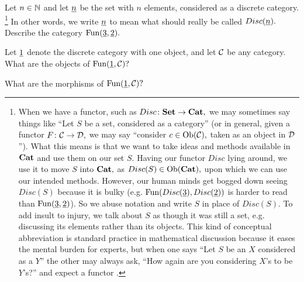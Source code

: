 \documentclass[CT4S-EN-RU]{subfiles}
\begin{document}
\begin{exerciseENG}
Let $n\in{\mathbb N}$ and let $\underline{n}$ be the set with $n$ elements, considered as a discrete category.
\footnote{When we have a functor, such as $Disc\colon{\mathbf{Set}}\rightarrow{\mathbf{Cat}},$ we may sometimes say things like “Let $S$ be a set, considered as a category” (or in general, given a functor $F\colon\mathcal{C}\rightarrow\mathcal{D},$ we may say “consider $c\in\textnormal{Ob}(\mathcal{C}),$ taken as an object in $\mathcal{D}$”). What this means is that we want to take ideas and methods available in ${\mathbf{Cat}}$ and use them on our set $S.$ Having our functor $Disc$ lying around, we use it to move $S$ into ${\mathbf{Cat}},$ as $Disc(S)\in\textnormal{Ob}({\mathbf{Cat}}),$ upon which we can use our intended methods. However, our human minds get bogged down seeing $Disc(S)$ because it is bulky (e.g. $\textnormal{Fun}(Disc(\underline{3}),Disc(\underline{2}))$ is harder to read than $\textnormal{Fun}(\underline{3},\underline{2})$). So we abuse notation and write $S$ in place of  $Disc(S).$ To add insult to injury, we talk about $S$ as though it was still a set, e.g. discussing its elements rather than its objects. This kind of conceptual abbreviation is standard practice in mathematical discussion because it eases the mental burden for experts, but when one says “Let $S$ be an $X$ considered as a $Y$” the other may always ask, “How again are you considering $X$'s to be $Y$'s?” and expect a functor .}
In other words, we write $\underline{n}$ to mean what should really be called $Disc(\underline{n}).$ Describe the category $\textnormal{Fun}(\underline{3},\underline{2}).$
\end{exerciseENG}

\begin{exerciseRUS}
\end{exerciseRUS}

\begin{exerciseENG}
Let $\underline{1}$ denote the discrete category with one object, and let $\mathcal{C}$ be any category.
\sexc What are the objects of $\textnormal{Fun}(\underline{1},\mathcal{C})?$
\item What are the morphisms of $\textnormal{Fun}(\underline{1},\mathcal{C})?$
\endsexc
\end{exerciseENG}

\begin{exerciseRUS}
\end{exerciseRUS}
\end{document}

